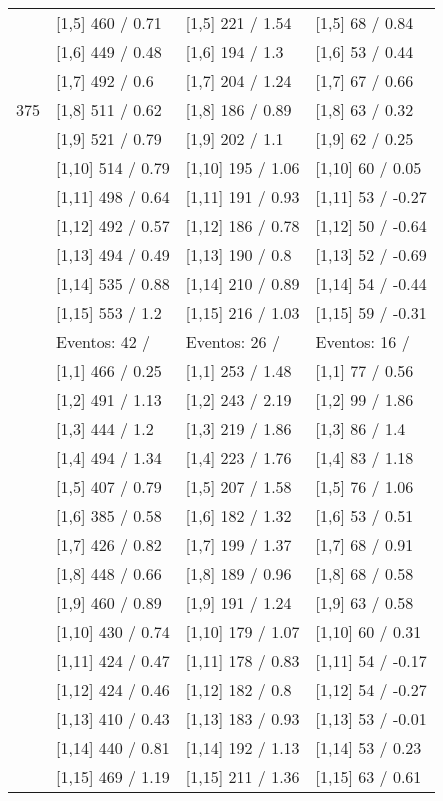 \begin{table}
\begin{tabular}[t]{llll}
 & {}[1,5] 460  / 0.71 & {}[1,5] 221  / 1.54 & {}[1,5] 68  / 0.84\\
 & {}[1,6] 449  / 0.48 & {}[1,6] 194  / 1.3 & {}[1,6] 53  / 0.44\\
 & {}[1,7] 492  / 0.6 & {}[1,7] 204  / 1.24 & {}[1,7] 67  / 0.66\\
375 & {}[1,8] 511  / 0.62 & {}[1,8] 186  / 0.89 & {}[1,8] 63  / 0.32\\
\addlinespace
 & {}[1,9] 521  / 0.79 & {}[1,9] 202  / 1.1 & {}[1,9] 62  / 0.25\\
 & {}[1,10] 514  / 0.79 & {}[1,10] 195  / 1.06 & {}[1,10] 60  / 0.05\\
 & {}[1,11] 498  / 0.64 & {}[1,11] 191  / 0.93 & {}[1,11] 53  / -0.27\\
 & {}[1,12] 492  / 0.57 & {}[1,12] 186  / 0.78 & {}[1,12] 50  / -0.64\\
 & {}[1,13] 494  / 0.49 & {}[1,13] 190  / 0.8 & {}[1,13] 52  / -0.69\\
\addlinespace
 & {}[1,14] 535  / 0.88 & {}[1,14] 210  / 0.89 & {}[1,14] 54  / -0.44\\
 & {}[1,15] 553  / 1.2 & {}[1,15] 216  / 1.03 & {}[1,15] 59  / -0.31\\
 & Eventos:  42 / & Eventos:  26 / & Eventos:  16 /\\
 & {}[1,1] 466  / 0.25 & {}[1,1] 253  / 1.48 & {}[1,1] 77  / 0.56\\
 & {}[1,2] 491  / 1.13 & {}[1,2] 243  / 2.19 & {}[1,2] 99  / 1.86\\
\addlinespace
 & {}[1,3] 444  / 1.2 & {}[1,3] 219  / 1.86 & {}[1,3] 86  / 1.4\\
 & {}[1,4] 494  / 1.34 & {}[1,4] 223  / 1.76 & {}[1,4] 83  / 1.18\\
 & {}[1,5] 407  / 0.79 & {}[1,5] 207  / 1.58 & {}[1,5] 76  / 1.06\\
 & {}[1,6] 385  / 0.58 & {}[1,6] 182  / 1.32 & {}[1,6] 53  / 0.51\\
 & {}[1,7] 426  / 0.82 & {}[1,7] 199  / 1.37 & {}[1,7] 68  / 0.91\\
\addlinespace
500 & {}[1,8] 448  / 0.66 & {}[1,8] 189  / 0.96 & {}[1,8] 68  / 0.58\\
 & {}[1,9] 460  / 0.89 & {}[1,9] 191  / 1.24 & {}[1,9] 63  / 0.58\\
 & {}[1,10] 430  / 0.74 & {}[1,10] 179  / 1.07 & {}[1,10] 60  / 0.31\\
 & {}[1,11] 424  / 0.47 & {}[1,11] 178  / 0.83 & {}[1,11] 54  / -0.17\\
 & {}[1,12] 424  / 0.46 & {}[1,12] 182  / 0.8 & {}[1,12] 54  / -0.27\\
\addlinespace
 & {}[1,13] 410  / 0.43 & {}[1,13] 183  / 0.93 & {}[1,13] 53  / -0.01\\
 & {}[1,14] 440  / 0.81 & {}[1,14] 192  / 1.13 & {}[1,14] 53  / 0.23\\
 & {}[1,15] 469  / 1.19 & {}[1,15] 211  / 1.36 & {}[1,15] 63  / 0.61\\
\bottomrule
\end{tabular}
\end{table}
